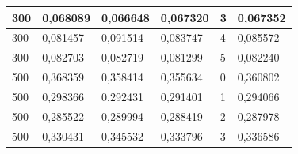 \documentclass[12pt,a4paper,oneside,final]{article}
\begin{document}
\begin{table}[]
\begin{tabular}{|l|l|l|l|l|l|}
300                                                              & 0,068089                                                      & 0,066648                                                      & 0,067320                                                       & 3     & 0,067352                                                               \\ \hline
300                                                              & 0,081457                                                      & 0,091514                                                      & 0,083747                                                      & 4     & 0,085572                                                               \\ \hline
300                                                              & 0,082703                                                      & 0,082719                                                      & 0,081299                                                      & 5     & 0,082240                                                               \\ \hline
500                                                              & 0,368359                                                      & 0,358414                                                      & 0,355634                                                      & 0     & 0,360802                                                               \\ \hline
500                                                              & 0,298366                                                      & 0,292431                                                      & 0,291401                                                      & 1     & 0,294066                                                               \\ \hline
500                                                              & 0,285522                                                      & 0,289994                                                      & 0,288419                                                      & 2     & 0,287978                                                              \\ \hline
500                                                              & 0,330431                                                      & 0,345532                                                      & 0,333796                                                      & 3     & 0,336586                                                               \\ \hline

\end{tabular}
\end{table}
\end{document}
